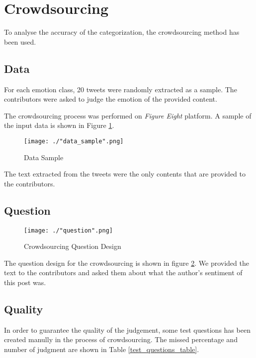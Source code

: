 \section{Crowdsourcing}

To analyse the accuracy of the categorization, the crowdsourcing method has been used.

\subsection{Data}
For each emotion class, 20 tweets were randomly extracted as a sample. The contributors were asked to judge the emotion of the provided content.

The crowdsourcing process was performed on \textit{Figure Eight} platform. A sample of the input data is shown in Figure \ref{data_sample}.

\begin{figure}[ht]
    \centering
    \texttt{[image: ./"data\_sample".png]}
    \caption{Data Sample}
    \label{data_sample}
\end{figure}

The text extracted from the tweets were the only contents that are provided to the contributors. 

\subsection{Question}

\begin{figure}[ht]
    \centering
    \texttt{[image: ./"question".png]}
    \caption{Crowdsourcing Question Design}
    \label{question}
\end{figure}

The question design for the crowdsourcing is shown in figure \ref{question}. We provided the text to the contributors and asked them about what the author's sentiment of this post was.

\subsection{Quality}

In order to guarantee the quality of the judgement, some test questions has been created manully in the process of crowdsourcing. The missed percentage and number of judgment are shown in Table \ref{test_questions_table}.


